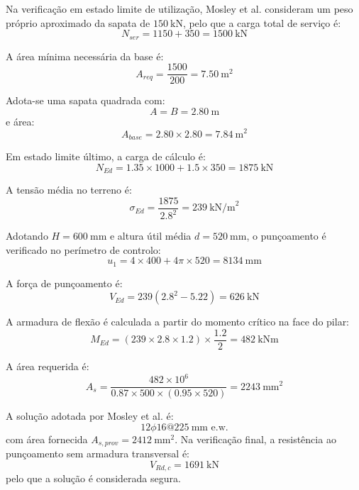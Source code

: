 Na verificação em estado limite de utilização, Mosley et al. consideram um peso próprio aproximado da sapata de \(150\ \text{kN}\), pelo que a carga total de serviço é:
\begin{equation}
N_{ser}=1150+350=1500\ \text{kN}
\end{equation}

A área mínima necessária da base é:
\begin{equation}
A_{req}=\frac{1500}{200}=7.50\ \text{m}^2
\end{equation}

Adota-se uma sapata quadrada com:
\begin{equation}
A=B=2.80\ \text{m}
\end{equation}
e área:
\begin{equation}
A_{base}=2.80\times 2.80 = 7.84\ \text{m}^2
\end{equation}

Em estado limite último, a carga de cálculo é:
\begin{equation}
N_{Ed}=1.35\times 1000 + 1.5\times 350 = 1875\ \text{kN}
\end{equation}

A tensão média no terreno é:
\begin{equation}
\sigma_{Ed}=\frac{1875}{2.8^2}=239\ \text{kN/m}^2
\end{equation}

Adotando \(H=600\ \text{mm}\) e altura útil média \(d=520\ \text{mm}\), o punçoamento é verificado no perímetro de controlo:
\begin{equation}
u_1 = 4\times 400 + 4\pi\times 520 = 8134\ \text{mm}
\end{equation}

A força de punçoamento é:
\begin{equation}
V_{Ed}=239(2.8^2-5.22)=626\ \text{kN}
\end{equation}

A armadura de flexão é calculada a partir do momento crítico na face do pilar:
\begin{equation}
M_{Ed}=(239\times 2.8 \times 1.2)\times \frac{1.2}{2}=482\ \text{kNm}
\end{equation}

A área requerida é:
\begin{equation}
A_s=\frac{482\times 10^6}{0.87\times 500 \times (0.95\times 520)} = 2243\ \text{mm}^2
\end{equation}

A solução adotada por Mosley et al. é:
\begin{equation}
12\phi16 @ 225\ \text{mm\ e.w.}
\end{equation}
com área fornecida \(A_{s,prov}=2412\ \text{mm}^2\). Na verificação final, a resistência ao punçoamento sem armadura transversal é:
\begin{equation}
V_{Rd,c}=1691\ \text{kN}
\end{equation}
pelo que a solução é considerada segura.

